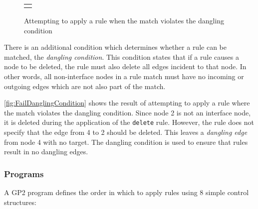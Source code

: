 \documentclass[authoryearcitations]{UoYCSproject}
\begin{document}
\begin{figure}
\begin{center}
\begin{tabular}{l}
\begin{tikzpicture}
            \end{tikzpicture}

        \end{tabular}
    \end{center}
    \caption{Attempting to apply a rule when the match violates the dangling condition}
    \label{fig:FailDanglingCondition}
\end{figure}

There is an additional condition which determines whether a rule can be matched, the
\emph{dangling condition}. This condition states that if a rule causes a node to be
deleted, the rule must also delete all edges incident to that node. In
other words, all non-interface nodes in a rule match must have no incoming or outgoing
edges which are not also part of the match.

\autoref{fig:FailDanglingCondition} shows the result of attempting to apply a rule
where the match violates the dangling condition. Since node 2 is not an interface
node, it is deleted during the application of the \texttt{delete} rule. However, the
rule does not specify that the edge from 4 to 2 should be deleted. This leaves a
\emph{dangling edge} from node 4 with no target. The dangling condition is used to
ensure that rules result in no dangling edges.


\subsubsection{Programs}
\label{sec:Programs}

A GP2 program defines the order in which to apply rules using 8 simple control
structures:
\end{document}
